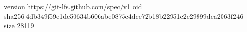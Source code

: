 version https://git-lfs.github.com/spec/v1
oid sha256:4db349f59e1dc50634b606abe0875c4dce72b18b22951c2e29999dea2063f246
size 28119
